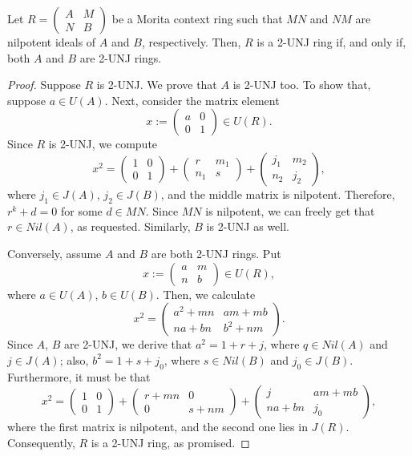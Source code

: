\documentclass[10pt,a4paper]{amsart}
\begin{document}
\begin{proposition}\label{4.7}
Let $R=\left(\begin{array}{ll}A & M \\ N & B\end{array}\right)$ be a Morita context ring such that $MN$ and $NM$ are nilpotent ideals of $A$ and $B$, respectively. Then, $R$ is a 2-UNJ ring if, and only if, both $A$ and $B$ are 2-UNJ rings.
\end{proposition}

\begin{proof}
Suppose $R$ is 2-UNJ. We prove that $A$ is 2-UNJ too. To show that, suppose \( a \in U(A) \). Next, consider the matrix element
\[
x := \begin{pmatrix} a & 0 \\ 0 & 1 \end{pmatrix} \in U(R).
\]
Since \( R \) is 2-UNJ, we compute
\[
x^2 = \begin{pmatrix} 1 & 0 \\ 0 & 1 \end{pmatrix} +
\begin{pmatrix} r & m_1 \\ n_1 & s \end{pmatrix} +
\begin{pmatrix} j_1 & m_2 \\ n_2 & j_2 \end{pmatrix},
\]
where \( j_1 \in J(A) \), \( j_2 \in J(B) \), and the middle matrix is nilpotent. Therefore, \( r^k + d = 0 \) for some \( d \in MN\). Since $MN$ is nilpotent, we can freely get that \( r \in Nil(A) \), as requested. Similarly, \( B \) is 2-UNJ as well.

Conversely, assume \( A \) and \( B \) are both 2-UNJ rings. Put
\[
x := \begin{pmatrix} a & m \\ n & b \end{pmatrix} \in U(R),
\]
where \( a \in U(A) \), \( b \in U(B) \). Then, we calculate
\[
x^2 = \begin{pmatrix}
	a^2 + mn & am + mb \\
	na + bn & b^2 + nm
\end{pmatrix}.
\]
Since \( A \), \( B \) are 2-UNJ, we derive that $a^2 = 1 + r + j$, where $q \in Nil(A)$ and $j \in J(A)$; also, $b^2 = 1 + s + j_0$, where $s\in Nil(B)$ and $j_0 \in J(B)$.
Furthermore, it must be that
\[
x^2 = \begin{pmatrix} 1 & 0 \\ 0 & 1 \end{pmatrix} +
\begin{pmatrix} r + mn & 0 \\ 0 & s + nm \end{pmatrix} +
\begin{pmatrix} j & am + mb \\ na + bn & j_0 \end{pmatrix},
\]
where the first matrix is nilpotent, and the second one lies in \( J(R) \). Consequently, \( R \) is a 2-UNJ ring, as promised.
\end{proof}
\end{document}
